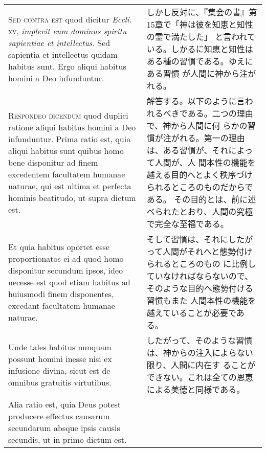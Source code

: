 \documentclass[10pt]{jsarticle} %
\begin{document}
\begin{longtable}{p{21em}p{21em}}
\\



{\scshape Sed contra est} quod dicitur {\itshape Eccli}.~{\scshape
xv}, {\itshape implevit eum dominus spiritu sapientiae et
intellectus}. Sed sapientia et intellectus quidam habitus sunt. Ergo
aliqui habitus homini a Deo infunduntur.

&

しかし反対に、『集会の書』第15章で「神は彼を知恵と知性の霊で満たした」
と言われている。しかるに知恵と知性はある種の習慣である。ゆえにある習慣
が人間に神から注がれる。

\\



{\scshape Respondeo dicendum} quod duplici ratione aliqui habitus
homini a Deo infunduntur. Prima ratio est, quia aliqui habitus sunt
quibus homo bene disponitur ad finem excedentem facultatem humanae
naturae, qui est ultima et perfecta hominis beatitudo, ut supra dictum
est.

&


解答する。以下のように言われるべきである。二つの理由で、神から人間に何
らかの習慣が注がれる。第一の理由は、ある習慣が、それによって人間が、人
間本性の機能を越える目的へとよく秩序づけられるところのものだからである。
その目的とは、前に述べられたとおり、人間の究極で完全な至福である。

\\

Et quia habitus oportet esse proportionatos ei ad quod homo disponitur
secundum ipsos, ideo necesse est quod etiam habitus ad huiusmodi finem
disponentes, excedant facultatem humanae naturae.

&

そして習慣は、それにしたがって人間がそれへと態勢付けられるところのもの
に比例していなければならないので、そのような目的へ態勢付ける習慣もまた
人間本性の機能を越えていることが必要である。

\\

Unde tales habitus nunquam possunt homini inesse nisi ex infusione
divina, sicut est de omnibus gratuitis virtutibus.

&

したがって、そのような習慣は、神からの注入によらない限り、人間に内在す
ることができない。これは全ての恩恵による美徳と同様である。


\\

Alia ratio est, quia Deus potest producere effectus causarum
secundarum absque ipsis causis secundis, ut in primo dictum est.



\end{longtable}
\end{document}

